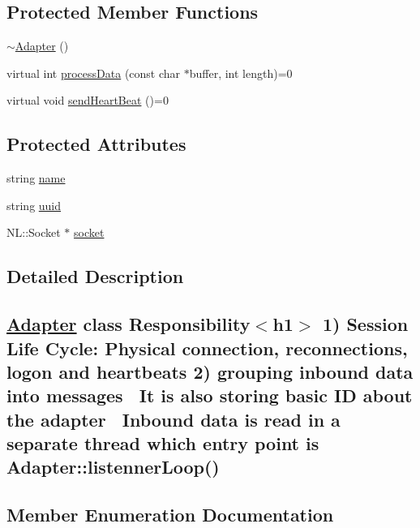 \subsection*{Protected Member Functions}
\begin{DoxyCompactItemize}
\item 
\hyperlink{classMetal_1_1Adapter_aa29cb8913565cd6dbc62cb760fdfd2b4}{$\sim$\+Adapter} ()
\item 
virtual int \hyperlink{classMetal_1_1Adapter_a195072772568dc0fd7a859ed2c99d5c7}{process\+Data} (const char $\ast$buffer, int length)=0
\item 
virtual void \hyperlink{classMetal_1_1Adapter_a6d045031f6daa5bf72a5cb87acde907e}{send\+Heart\+Beat} ()=0
\end{DoxyCompactItemize}
\subsection*{Protected Attributes}
\begin{DoxyCompactItemize}
\item 
string \hyperlink{classMetal_1_1Adapter_a8d86d5f95e20d3b9feeb4f0bedcf5785}{name}
\item 
string \hyperlink{classMetal_1_1Adapter_a5175a897fa7c1ad65ebf03baea3c5479}{uuid}
\item 
N\+L\+::\+Socket $\ast$ \hyperlink{classMetal_1_1Adapter_a4326175a27a003918fafb0d738e64d1c}{socket}
\end{DoxyCompactItemize}


\subsection{Detailed Description}
\subsection*{\hyperlink{classMetal_1_1Adapter}{Adapter} class Responsibility$<$h1$>$ 1) Session Life Cycle\+: Physical connection, reconnections, logon and heartbeats 2) grouping inbound data into messages~\newline
 It is also storing basic I\+D about the adapter~\newline
 Inbound data is read in a separate thread which entry point is Adapter\+::listenner\+Loop() }

\subsection{Member Enumeration Documentation}
\hypertarget{classMetal_1_1Adapter_a61c44194e1ca48fb73a122997c5c7f27}{}
